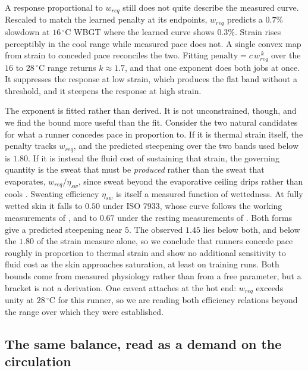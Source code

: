 A response proportional to $w_{req}$ still does not quite describe the measured
curve. Rescaled to match the learned penalty at its endpoints, $w_{req}$
predicts a $0.7\%$ slowdown at $16\,^{\circ}$C WBGT where the learned curve
shows $0.3\%$. Strain rises perceptibly in the cool range while measured pace
does not. A single convex map from strain to conceded pace reconciles the two.
Fitting $\text{penalty} = c\,w_{req}^{\,k}$ over the $16$ to $28\,^{\circ}$C
range returns $k \approx 1.7$, and that one exponent does both jobs at once. It
suppresses the response at low strain, which produces the flat band without a
threshold, and it steepens the response at high strain.

The exponent is fitted rather than derived. It is not unconstrained, though, and
we find the bound more useful than the fit. Consider the two natural candidates
for what a runner concedes pace in proportion to. If it is thermal strain
itself, the penalty tracks $w_{req}$, and the predicted steepening over the two
bands used below is $1.80$. If it is instead the fluid cost of sustaining that
strain, the governing quantity is the sweat that must be \emph{produced} rather
than the sweat that evaporates, $w_{req}/\eta_{sw}$, since sweat beyond the
evaporative ceiling drips rather than cools \citep{taylor2006}. Sweating
efficiency $\eta_{sw}$ is itself a measured function of wettedness. At fully
wetted skin it falls to $0.50$ under ISO 7933, whose curve follows the working
measurements of \citet{alber1985}, and to $0.67$ under the resting measurements
of \citet{candas1979}. Both forms give a predicted steepening near $5$. The
observed $1.45$ lies below both, and below the $1.80$ of the strain measure alone, so we conclude
that runners concede pace roughly in proportion to thermal strain and show no additional
sensitivity to fluid cost as the skin approaches saturation, at least on training runs. Both
bounds come from measured physiology rather than from a free parameter, but a
bracket is not a derivation. One caveat attaches at the hot end: $w_{req}$
exceeds unity at $28\,^{\circ}$C for this runner, so we are reading both
efficiency relations beyond the range over which they were established.

\subsection{The same balance, read as a demand on the circulation}
\label{app:physics:circulation}

